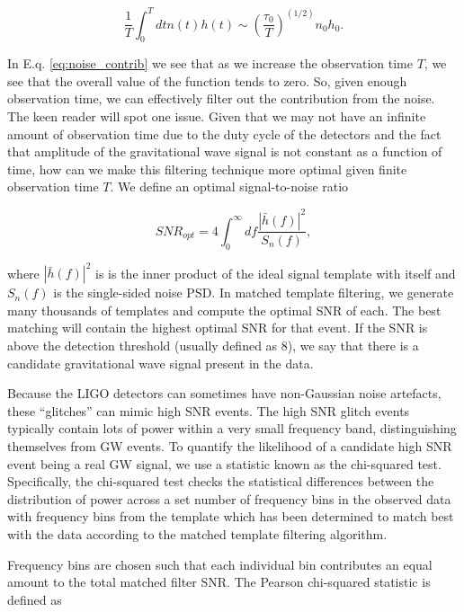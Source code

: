 \begin{equation} \label{eq:noise_contrib}
    \frac{1}{T} \int_0^T dt n(t) h(t) \sim (\frac{\tau_{0}}{T})^{(1/2)} n_{0} h_{0}.
\end{equation}{}

In E.q. \ref{eq:noise_contrib} we see that as we increase the observation time $T$, we see that the overall value of the function tends to zero. So, given enough observation time, we can effectively filter out the contribution from the noise. The keen reader will spot one issue. Given that we may not have an infinite amount of observation time due to the duty cycle of the detectors and the fact that amplitude of the gravitational wave signal is not constant as a function of time, how can we make this filtering technique more optimal given finite observation time $T$. We define an optimal signal-to-noise ratio

\begin{equation}
    SNR_{opt} = 4 \int_0^{\infty} df \frac{|\bar{h}(f)|^2}{S_{n}(f)},
\end{equation}{}

where $|\bar{h}(f)|^2$ is is the inner product of the ideal signal template with itself and $S_{n}(f)$ is the single-sided noise \ac{PSD}. In matched template filtering, we generate many thousands of templates and compute the optimal \ac{SNR} of each. The best matching will contain the highest optimal \ac{SNR} for that event. If the \ac{SNR} is above the detection threshold (usually defined as 8), we say that there is a candidate gravitational wave signal present in the data.

%
%
Because the \ac{LIGO} detectors can sometimes have non-Gaussian noise artefacts, these ``glitches'' can mimic high \ac{SNR} events. The high \ac{SNR} glitch events typically contain lots of power within a very small frequency band, distinguishing themselves from \ac{GW} events. To quantify the likelihood of a candidate high \ac{SNR} event being a real \ac{GW} signal, we use a statistic known as the chi-squared test. Specifically, the chi-squared test checks the statistical differences between the distribution of power across a set number of frequency bins in the observed data with frequency bins from the template which has been determined to match best with the data according to the matched template filtering algorithm.

Frequency bins are chosen such that each individual bin contributes an equal amount to the total matched filter \ac{SNR}. The Pearson chi-squared statistic is defined as 

